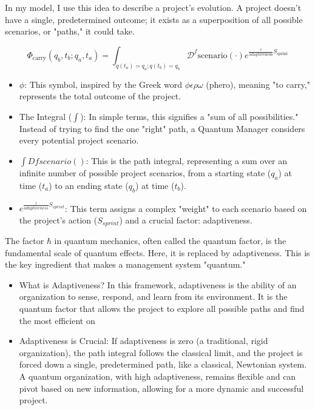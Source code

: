 \documentclass{article}
\begin{document}
In my model, I use this idea to describe a project's evolution. A project doesn't have a single, predetermined outcome; it exists as a superposition of all possible scenarios, or "paths," it could take.

\begin{equation}
\Phi_{\text{carry}}(q_b, t_b; q_a, t_a) = \int_{q(t_a)=q_a; q(t_b)=q_b} \mathcal{D}^f \text{scenario}(\cdot) e^{\frac{i}{\text{adaptiveness}} S_{\text{sprint}}}
\end{equation}
\begin{itemize}
\item $\phi$: This symbol, inspired by the Greek word $\phi \epsilon \rho \omega$ (phero), meaning "to carry," represents the total outcome of the project.
\item The Integral ($\int$): In simple terms, this signifies a "sum of all possibilities." Instead of trying to find the one "right" path, a Quantum Manager considers every potential project scenario.
\item $\int Dfscenario()$: This is the path integral, representing a sum over an infinite number of possible project scenarios, from a starting state ($q_a$) at time ($t_a$) to an ending state ($q_b$) at time ($t_b$).
\item $e^{\frac{i}{adaptiveness}S_{sprint}}$: This term assigns a complex "weight" to each scenario based on the project's action ($S_{sprint}$) and a crucial factor: adaptiveness.
\end{itemize}
The factor $\hbar$ in quantum mechanics, often called the quantum factor, is the fundamental scale of quantum effects. Here, it is replaced by adaptiveness. This is the key ingredient that makes a management system "quantum."

\begin{itemize}
\item What is Adaptiveness? In this framework, adaptiveness is the ability of an organization to sense, respond, and learn from its environment. It is the quantum factor that allows the project to explore all possible paths and find the most efficient on
\item Adaptiveness is Crucial: If adaptiveness is zero (a traditional, rigid organization), the path integral follows the classical limit, and the project is forced down a single, predetermined path, like a classical, Newtonian system. A quantum organization, with high adaptiveness, remains flexible and can pivot based on new information, allowing for a more dynamic and successful project.
\end{itemize}
\end{document}
